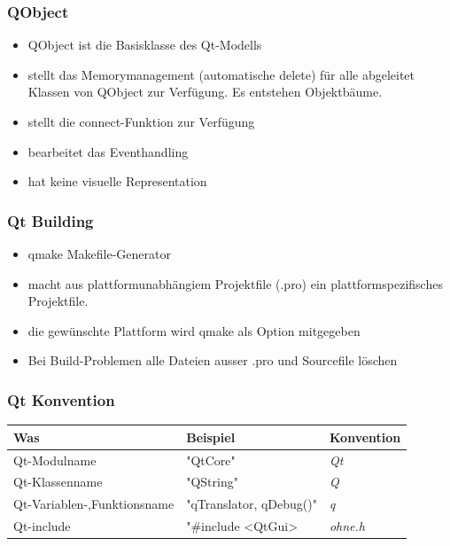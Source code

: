 \begin{multicols}{2}
	\subsubsection{QObject}
	\begin{itemize}
		\item QObject ist die Basisklasse des Qt-Modells
		\item stellt das Memorymanagement (automatische delete) für alle abgeleitet Klassen von QObject zur Verfügung. Es entstehen Objektbäume. 
		\item stellt die connect-Funktion zur Verfügung
		\item bearbeitet das Eventhandling
		\item hat keine visuelle Representation
	\end{itemize}
	
	\subsubsection{Qt Building}
	\begin{itemize}
		\item qmake Makefile-Generator
		\item macht aus plattformunabhängiem Projektfile (.pro) ein plattformspezifisches Projektfile. 
		\item die gewünschte Plattform wird qmake als Option mitgegeben
		\item Bei Build-Problemen alle Dateien ausser .pro und Sourcefile löschen
	\end{itemize}
\end{multicols}

\subsubsection{Qt Konvention}
\begin{tabular}{|l|l|l|}
	\hline \textbf{Was} & \textbf{Beispiel} &\textbf{Konvention}\\
	\hline Qt-Modulname & "QtCore"& \textit{Qt}\\
	\hline Qt-Klassenname & "QString" & \textit{Q}\\
	\hline Qt-Variablen-,Funktionsname & "qTranslator, qDebug()"& \textit{q}\\
	\hline Qt-include & "\#include <QtGui>& \textit{ohne.h}\\
	\hline
\end{tabular}

